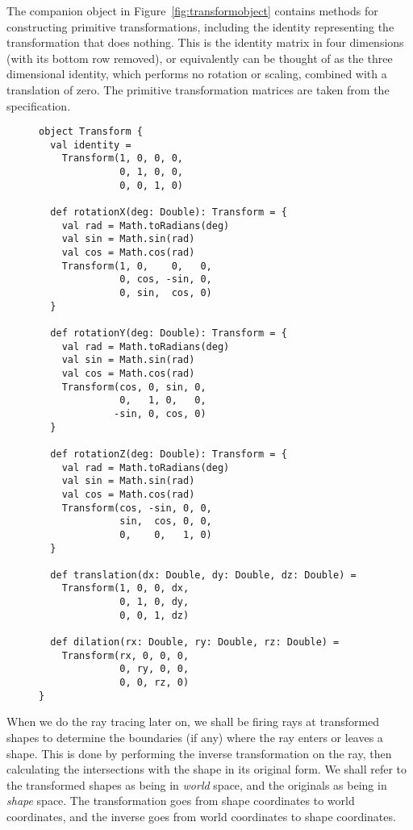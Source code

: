 The companion object in Figure~\ref{fig:transformobject}
contains methods for constructing primitive transformations,
including the identity representing the transformation that does nothing.
This is the identity matrix in four dimensions
(with its bottom row removed),
or equivalently can be thought of as the three dimensional identity,
which performs no rotation or scaling,
combined with a translation of zero.
The primitive transformation matrices are taken from the specification.

\begin{figure}
\begin{verbatim}
object Transform {
  val identity =
    Transform(1, 0, 0, 0,
              0, 1, 0, 0,
              0, 0, 1, 0)

  def rotationX(deg: Double): Transform = {
    val rad = Math.toRadians(deg)
    val sin = Math.sin(rad)
    val cos = Math.cos(rad)
    Transform(1, 0,    0,   0,
              0, cos, -sin, 0,
              0, sin,  cos, 0)
  }

  def rotationY(deg: Double): Transform = {
    val rad = Math.toRadians(deg)
    val sin = Math.sin(rad)
    val cos = Math.cos(rad)
    Transform(cos, 0, sin, 0,
              0,   1, 0,   0,
             -sin, 0, cos, 0)
  }

  def rotationZ(deg: Double): Transform = {
    val rad = Math.toRadians(deg)
    val sin = Math.sin(rad)
    val cos = Math.cos(rad)
    Transform(cos, -sin, 0, 0,
              sin,  cos, 0, 0,
              0,    0,   1, 0)
  }

  def translation(dx: Double, dy: Double, dz: Double) =
    Transform(1, 0, 0, dx,
              0, 1, 0, dy,
              0, 0, 1, dz)

  def dilation(rx: Double, ry: Double, rz: Double) =
    Transform(rx, 0, 0, 0,
              0, ry, 0, 0,
              0, 0, rz, 0)
}
\end{verbatim}
\getcaption
\end{figure}

When we do the ray tracing later on,
we shall be firing rays at transformed shapes
to determine the boundaries (if any)
where the ray enters or leaves a shape.
This is done by performing the inverse transformation on the ray,
then calculating the intersections with the shape in its original form.
We shall refer to the transformed shapes as being in \emph{world} space,
and the originals as being in \emph{shape} space.
The transformation goes from shape coordinates to world coordinates,
and the inverse goes from world coordinates to shape coordinates.

